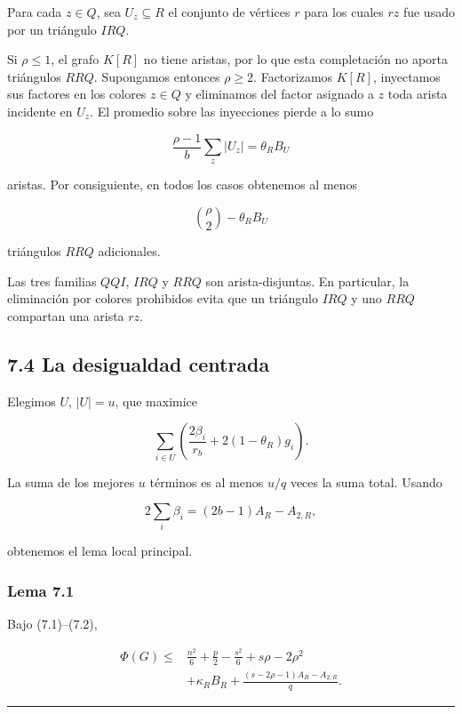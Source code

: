 \documentclass[
  11pt,
]{article}
\begin{document}
Para cada \(z\in Q\), sea \(U_z\subseteq R\) el conjunto de vértices
\(r\) para los cuales \(rz\) fue usado por un triángulo \(IRQ\).

Si \(\rho\le1\), el grafo \(K[R]\) no tiene aristas, por lo que esta
completación no aporta triángulos \(RRQ\). Supongamos entonces
\(\rho\ge2\). Factorizamos \(K[R]\), inyectamos sus factores en los
colores \(z\in Q\) y eliminamos del factor asignado a \(z\) toda arista
incidente en \(U_z\). El promedio sobre las inyecciones pierde a lo sumo

\[
\frac{\rho-1}{b}\sum_z|U_z|
=
\theta_RB_U
\]

aristas. Por consiguiente, en todos los casos obtenemos al menos

\[
\binom\rho2-\theta_RB_U
\]

triángulos \(RRQ\) adicionales.

Las tres familias \(QQI\), \(IRQ\) y \(RRQ\) son arista-disjuntas. En
particular, la eliminación por colores prohibidos evita que un triángulo
\(IRQ\) y uno \(RRQ\) compartan una arista \(rz\).

\subsection{7.4 La desigualdad centrada}\label{la-desigualdad-centrada}

Elegimos \(U\), \(|U|=u\), que maximice

\[
\sum_{i\in U}
\left(
\frac{2\beta_i}{r_b}+2(1-\theta_R)g_i
\right).
\]

La suma de los mejores \(u\) términos es al menos \(u/q\) veces la suma
total. Usando

\[
2\sum_i\beta_i
=(2b-1)A_R-A_{2,R},
\]

obtenemos el lema local principal.

\subsubsection{Lema 7.1}\label{lema-7.1-desigualdad-de-ganancias-reservadas-respecto-de-un-centro-desplazado}

Bajo (7.1)--(7.2),

\[
\boxed{
\begin{aligned}
\Phi(G)
\le{}&
\frac{n^2}{6}+\frac p2-\frac{s^2}{6}
+s\rho-2\rho^2\\
&+
\kappa_RB_R
+
\frac{(s-2\rho-1)A_R-A_{2,R}}q.
\end{aligned}
}
\tag{7.6}
\]

\begin{center}\rule{0.5\linewidth}{0.5pt}\end{center}
\end{document}
